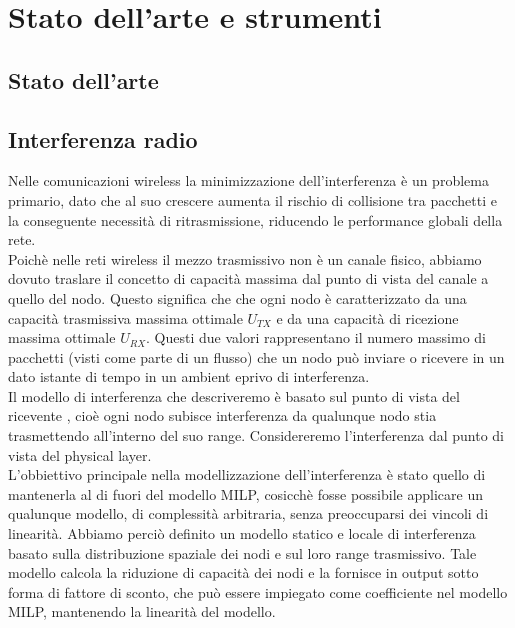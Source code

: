  \chapter{Stato dell'arte e strumenti}

\ifpdf
    \graphicspath{{Chapter4/Figs/Raster/}{Chapter4/Figs/PDF/}{Chapter4/Figs/}}
\else
    \graphicspath{{Chapter4/Figs/Vector/}{Chapter4/Figs/}}
\fi

\section{Stato dell'arte}

\section{Interferenza radio}
Nelle comunicazioni wireless la minimizzazione dell'interferenza è un problema primario, dato che al suo crescere aumenta il rischio di collisione tra pacchetti e la conseguente necessità di ritrasmissione, riducendo le performance globali della rete. \\
Poichè nelle reti wireless il mezzo trasmissivo non è un canale fisico, abbiamo dovuto traslare il concetto di capacità massima dal punto di vista del canale a quello del nodo. Questo significa che che ogni nodo è caratterizzato da una capacità trasmissiva massima ottimale $U_{TX}$ e da una capacità di ricezione massima ottimale $U_{RX}$. Questi due valori rappresentano il numero massimo di pacchetti (visti come parte di un flusso) che un nodo può inviare o ricevere in un dato istante di tempo in un ambient eprivo di interferenza. \\
Il modello di interferenza che descriveremo è basato sul punto di vista del ricevente \cite{Rickenbach05arobust}, cioè ogni nodo subisce interferenza da qualunque nodo stia trasmettendo all'interno del suo range. Considereremo l'interferenza dal punto di vista del physical layer. \\
L'obbiettivo principale nella modellizzazione dell'interferenza è stato quello di mantenerla al di fuori del modello MILP, cosicchè fosse possibile applicare un qualunque modello, di complessità arbitraria, senza preoccuparsi dei vincoli di linearità.
Abbiamo perciò definito un modello statico e locale di interferenza basato sulla distribuzione spaziale dei nodi e sul loro range trasmissivo. Tale modello calcola la riduzione di capacità dei nodi e la fornisce in output sotto forma di fattore di sconto, che può essere impiegato come coefficiente nel modello MILP, mantenendo la linearità del modello.

